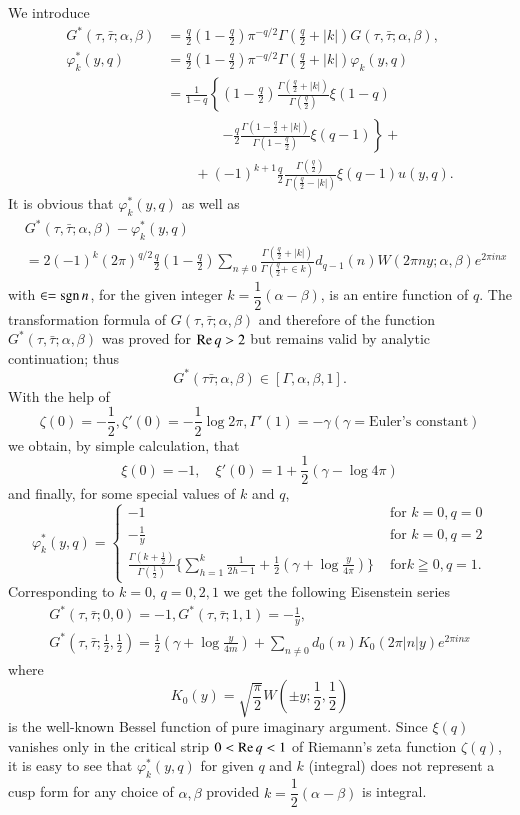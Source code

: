 We introduce \pageoriginale
\begin{align*}
G^{\ast} (\tau,\bar{\tau};\alpha,\beta) & = \frac{q}{2}
(1-\frac{q}{2}) \pi^{-q/2} \Gamma(\frac{q}{2}+|k|)
G(\tau,\bar{\tau};\alpha,\beta),\\
\varphi^{\ast}_k(y,q) & = \frac{q}{2} (1-\frac{q}{2}) \pi^{-q/2}
\Gamma(\frac{q}{2}+|k|) \varphi_k(y,q)\\
& = \frac{1}{1-q} \left\{(1-\frac{q}{2})
\frac{\Gamma(\frac{q}{2}+|k|)}{\Gamma(\frac{q}{2})} \xi(1-q)\right.\\
&\qquad\qquad\left.-\frac{q}{2} \frac{\Gamma(1-\frac{q}{2}+|k|)}{\Gamma(1-\frac{q}{2})}
\xi (q-1)\right\}+ \\
& \qquad + (-1)^{k+1} \frac{q}{2}
\frac{\Gamma(\frac{q}{2})}{\Gamma(\frac{q}{2} -|k|)} \xi (q-1) u(y,q).
\end{align*}
It is obvious that $\varphi^{\ast}_k(y,q)$ as well as 
\begin{align*}
& G^{\ast} (\tau, \bar{\tau}; \alpha, \beta) -\varphi^{\ast}_k(y,q)\\
& = 2(-1)^k (2\pi)^{q/2} \frac{q}{2} (1-\frac{q}{2}) \sum_{n\neq 0}
  \frac{\Gamma(\frac{q}{2}+|k|)}{\Gamma(\frac{q}{2}+\in k)}
  d_{q-1} (n) W(2\pi n y;\alpha, \beta)e^{2\pi i n x}
\end{align*}
with $\in=\operatorname{sgn} n$, for the given integer
$k=\dfrac{1}{2}(\alpha-\beta)$, is an entire function of $q$. The
transformation formula of $G(\tau,\bar{\tau}; \alpha,\beta)$ and
therefore of the function $G^{\ast}(\tau,\bar{\tau};\alpha,\beta)$ was
proved for $\operatorname{Re} q>2$ but remains valid by analytic continuation; thus 
$$
G^{\ast}(\tau\bar{\tau};\alpha,\beta) \in [\Gamma,\alpha,\beta,1].
$$
With the help of 
$$
\zeta(0) = -\frac{1}{2}, \zeta'(0) = -\frac{1}{2} \log 2\pi, \Gamma'(1)
=-\gamma (\gamma=\text{Euler's constant})
$$
we obtain, by simple calculation, that
$$
\xi(0) = -1, \quad \xi'(0) = 1 + \frac{1}{2} (\gamma-\log 4\pi)
$$
and finally, for some special values of $k$ and $q$,
$$
\varphi^{\ast}_k(y,q) = \begin{cases}
-1 & \text{ for } k=0, q=0\\
-\frac{1}{y} & \text{ for } k=0, q=2\\
\frac{\Gamma(k+\frac{1}{2})}{\Gamma(\frac{1}{2})} \{\sum^{k}_{h=1}
\frac{1}{2h-1} + \frac{1}{2} (\gamma+\log\frac{y}{4\pi})\} & \text{ for
} k \geqq 0, q=1.
\end{cases}
$$\pageoriginale
Corresponding to $k=0$, $q=0,2,1$ we get the following Eisenstein
series
\begin{gather*}
G^{\ast} (\tau,\bar{\tau};0,0) =-1, G^{\ast} (\tau,\bar{\tau};1,1)
=-\frac{1}{y},\\
G^{\ast} (\tau,\bar{\tau};\frac{1}{2},\frac{1}{2}) =\frac{1}{2}(\gamma
+ \log \frac{y}{4m}) + \sum_{n\neq 0} d_0(n) K_0(2\pi |n|y)e^{2\pi inx}
\end{gather*}
where 
$$
K_0(y) =\sqrt{\frac{\pi}{2}} W(\pm y;\frac{1}{2},\frac{1}{2})
$$
is the well-known Bessel function of pure imaginary argument. Since
$\xi(q)$ vanishes only in the critical strip $0<\operatorname{Re} q<1$ of Riemann's
zeta function $\zeta(q)$, it is easy to see that
$\varphi^{\ast}_k(y,q)$ for given $q$ and $k$ (integral) does not
represent a cusp form for any choice of $\alpha,\beta$ provided
$k=\dfrac{1}{2}(\alpha-\beta)$ is integral.

